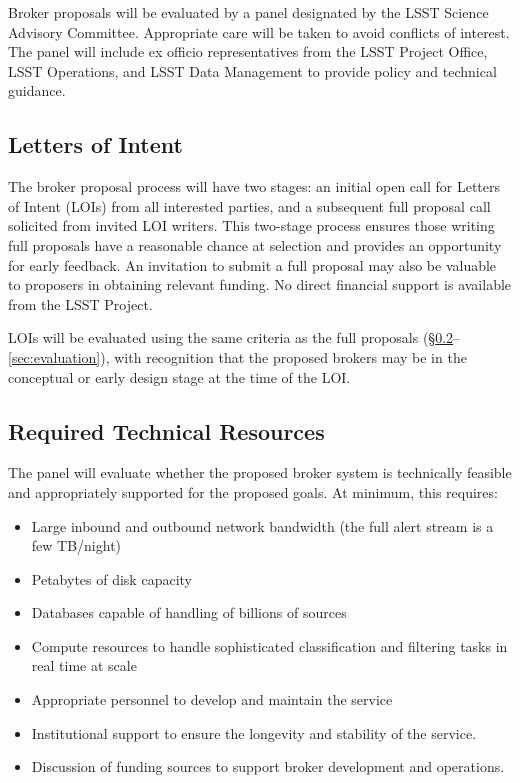Broker proposals will be evaluated by a panel designated by the LSST Science Advisory Committee.  Appropriate care will be taken to avoid conflicts of interest.
The panel will include ex officio representatives from the LSST Project Office, LSST Operations, and LSST Data Management to provide policy and technical guidance.

\subsection{Letters of Intent} \label{sec:LOIs}

The broker proposal process will have two stages:  
an initial open call for Letters of Intent (LOIs) from all interested parties, and a subsequent full proposal call solicited from invited LOI writers.
This two-stage process ensures those writing full proposals have a reasonable chance at selection and provides an opportunity for early feedback.
An invitation to submit a full proposal may also be valuable to proposers in obtaining relevant funding.
No direct financial support is available from the LSST Project.

LOIs will be evaluated using the same criteria as the full proposals (\S \ref{sec:resources}--\ref{sec:evaluation}), with recognition that the proposed brokers may be in the conceptual or early design stage at the time of the LOI.


\subsection{Required Technical Resources} \label{sec:resources}

The panel will evaluate whether the proposed broker system is technically feasible and appropriately supported for the proposed goals.  
At minimum, this requires:

\begin{itemize}
	\item Large inbound and outbound network bandwidth (the full alert stream is a few TB/night)
	\item Petabytes of disk capacity
	\item Databases capable of handling of billions of sources
	\item Compute resources to handle sophisticated classification and filtering tasks in real time at scale
	\item Appropriate personnel to develop and maintain the service
	\item Institutional support to ensure the longevity and stability of the service.
	\item Discussion of funding sources to support broker development and operations.
\end{itemize}

